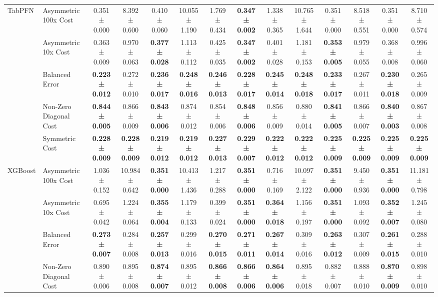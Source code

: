 \begin{table}[H]
{\begin{tabular}{llcccccccccccc}
\cline{1-14}
\multirow[t]{5}{*}{TabPFN} & Asymmetric 100x Cost & 0.351 ± 0.000 & 8.392 ± 0.600 & 0.410 ± 0.060 & 10.055 ± 1.190 & 1.769 ± 0.434 & \textbf{0.347 ± 0.002} & 1.338 ± 0.365 & 10.765 ± 1.644 & 0.351 ± 0.000 & 8.518 ± 0.551 & 0.351 ± 0.000 & 8.710 ± 0.574 \\
 & Asymmetric 10x Cost & 0.363 ± 0.009 & 0.970 ± 0.063 & \textbf{0.377 ± 0.028} & 1.113 ± 0.112 & 0.425 ± 0.035 & \textbf{0.347 ± 0.002} & 0.401 ± 0.028 & 1.181 ± 0.153 & \textbf{0.353 ± 0.005} & 0.979 ± 0.055 & 0.368 ± 0.008 & 0.996 ± 0.060 \\
 & Balanced Error & \textbf{0.223 ± 0.012} & 0.272 ± 0.010 & \textbf{0.236 ± 0.017} & \textbf{0.248 ± 0.016} & \textbf{0.246 ± 0.013} & \textbf{0.228 ± 0.017} & \textbf{0.245 ± 0.014} & \textbf{0.248 ± 0.018} & \textbf{0.233 ± 0.017} & 0.267 ± 0.011 & \textbf{0.230 ± 0.018} & 0.265 ± 0.009 \\
 & Non-Zero Diagonal Cost & \textbf{0.844 ± 0.005} & 0.866 ± 0.009 & \textbf{0.843 ± 0.006} & 0.874 ± 0.012 & 0.854 ± 0.006 & \textbf{0.848 ± 0.006} & 0.856 ± 0.009 & 0.880 ± 0.014 & \textbf{0.841 ± 0.005} & 0.866 ± 0.007 & \textbf{0.840 ± 0.003} & 0.867 ± 0.008 \\
 & Symmetric Cost & \textbf{0.228 ± 0.009} & \textbf{0.228 ± 0.009} & \textbf{0.219 ± 0.012} & \textbf{0.219 ± 0.012} & \textbf{0.227 ± 0.013} & \textbf{0.229 ± 0.007} & \textbf{0.222 ± 0.012} & \textbf{0.222 ± 0.012} & \textbf{0.225 ± 0.009} & \textbf{0.225 ± 0.009} & \textbf{0.225 ± 0.009} & \textbf{0.225 ± 0.009} \\
\cline{1-14}
\multirow[t]{5}{*}{XGBoost} & Asymmetric 100x Cost & 1.036 ± 0.152 & 10.984 ± 0.642 & \textbf{0.351 ± 0.000} & 10.413 ± 1.436 & 1.217 ± 0.288 & \textbf{0.351 ± 0.000} & 0.716 ± 0.169 & 10.097 ± 2.122 & \textbf{0.351 ± 0.000} & 9.450 ± 0.936 & \textbf{0.351 ± 0.000} & 11.181 ± 0.798 \\
 & Asymmetric 10x Cost & 0.695 ± 0.042 & 1.224 ± 0.064 & \textbf{0.355 ± 0.004} & 1.179 ± 0.133 & 0.399 ± 0.024 & \textbf{0.351 ± 0.000} & \textbf{0.364 ± 0.018} & 1.156 ± 0.197 & \textbf{0.351 ± 0.000} & 1.093 ± 0.092 & \textbf{0.352 ± 0.007} & 1.245 ± 0.080 \\
 & Balanced Error & \textbf{0.273 ± 0.007} & 0.284 ± 0.008 & \textbf{0.257 ± 0.013} & 0.299 ± 0.016 & \textbf{0.270 ± 0.015} & \textbf{0.271 ± 0.011} & \textbf{0.267 ± 0.014} & 0.309 ± 0.016 & \textbf{0.263 ± 0.012} & 0.307 ± 0.009 & \textbf{0.261 ± 0.015} & 0.288 ± 0.010 \\
 & Non-Zero Diagonal Cost & 0.890 ± 0.006 & 0.895 ± 0.008 & \textbf{0.874 ± 0.007} & 0.895 ± 0.012 & \textbf{0.866 ± 0.008} & \textbf{0.866 ± 0.006} & \textbf{0.864 ± 0.006} & 0.895 ± 0.018 & 0.882 ± 0.007 & 0.888 ± 0.010 & \textbf{0.870 ± 0.009} & 0.898 ± 0.010 \\

\end{tabular}}
\end{table}
